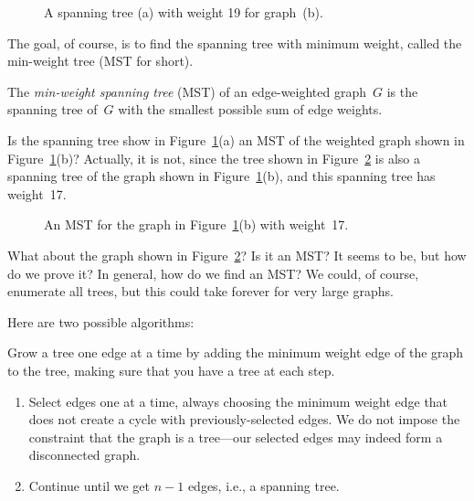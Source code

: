 \begin{figure}

\subfloat[]{%
    \missinggraphic
}
%
\qquad
%
\subfloat[]{%
    \missinggraphic
}

\caption{A spanning tree (a) with weight 19 for graph~(b).}

\label{fig:5KA}

\end{figure}

The goal, of course, is to find the spanning tree with minimum weight,
called the min-weight tree (MST for short).

\begin{definition}
The \emph{min-weight spanning tree} \textup(MST\textup) of an
edge-weighted graph~$G$ is the spanning tree of~$G$ with the smallest
possible sum of edge weights.
\end{definition}

Is the spanning tree show in Figure~\ref{fig:5KA}(a) an MST of the
weighted graph shown in Figure~\ref{fig:5KA}(b)?  Actually, it is not,
since the tree shown in Figure~\ref{fig:5KB} is also a spanning tree
of the graph shown in Figure~\ref{fig:5KA}(b), and this spanning tree
has weight~17.

\begin{figure}

\missinggraphic

\caption{An MST for the graph in Figure~\ref{fig:5KA}(b) with
  weight~17.}
\label{fig:5KB}

\end{figure}

What about the graph shown in Figure~\ref{fig:5KB}?  Is it an MST?  It
seems to be, but how do we prove it?  In general, how do we find an
MST\@?  We could, of course, enumerate all trees, but this could take
forever for very large graphs.

Here are two possible algorithms:

\begin{algorithm}\label{alg:MST1}
Grow a tree one edge at a time by adding the minimum weight edge of
the graph to the tree, making sure that you have a tree at each step.
\end{algorithm}

\begin{algorithm}\label{alg:MST2}
\begin{enumerate}

\item Select edges one at a time, always choosing the minimum weight
  edge that does not create a cycle with previously-selected edges.
  We do not impose the constraint that the graph is a tree---our
  selected edges may indeed form a disconnected graph.

\item Continue until we get $n - 1$ edges, i.e., a spanning tree.

\end{enumerate}
\end{algorithm}

